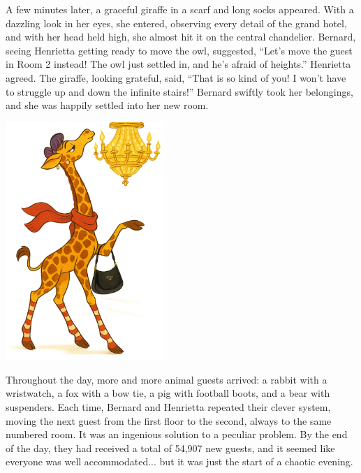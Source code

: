 A few minutes later, a graceful giraffe in a scarf and long socks appeared. With a dazzling look in her eyes, she entered, observing every detail of the grand hotel, and with her head held high, she almost hit it on the central chandelier. Bernard, seeing Henrietta getting ready to move the owl, suggested, ``Let's move the guest in Room 2 instead! The owl just settled in, and he's afraid of heights.'' Henrietta agreed. The giraffe, looking grateful, said, ``That is so kind of you! I won't have to struggle up and down the infinite stairs!'' Bernard swiftly took her belongings, and she was happily settled into her new room.

\vfill
\begin{center}
\includegraphics[width=0.45\textwidth]{images/giraffe.png}
\end{center}

\clearpage


Throughout the day, more and more animal guests arrived: a rabbit with a wristwatch, a fox with a bow tie, a pig with football boots, and a bear with suspenders. Each time, Bernard and Henrietta repeated their clever system, moving the next guest from the first floor to the second, always to the same numbered room. It was an ingenious solution to a peculiar problem. By the end of the day, they had received a total of 54,907 new guests, and it seemed like everyone was well accommodated... but it was just the start of a chaotic evening.
